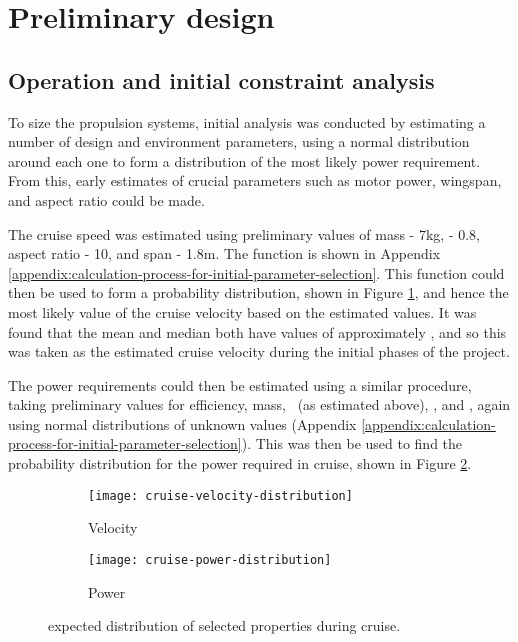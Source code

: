 \documentclass[../../main.tex]{subfiles}
\begin{document}

\section{Preliminary design} \label{sec:design-process:preliminary-design}

\subsection{Operation and initial constraint analysis} \label{sec:design-process:preliminary-design:operation-and-initial-constraint-analysis}

To size the propulsion systems, initial analysis was conducted by estimating a number of design and environment parameters, using a normal distribution around each one to form a distribution of the most likely power requirement.
From this, early estimates of crucial parameters such as motor power, wingspan, and aspect ratio could be made.

The cruise speed was estimated using preliminary values of mass - 7kg, \cl - 0.8, aspect ratio - 10, and span - 1.8m.
The function is shown in Appendix \ref{appendix:calculation-process-for-initial-parameter-selection}.
This function could then be used to form a probability distribution, shown in Figure \ref{fig:cruise-distribution:velocity}, and hence the most likely value of the cruise velocity based on the estimated values.
It was found that the mean and median both have values of approximately , and so this was taken as the estimated cruise velocity during the initial phases of the project. 

The power requirements could then be estimated using a similar procedure, taking preliminary values for efficiency, mass, \vcruise \, (as estimated above), \cl, and \cd, again using normal distributions of unknown values (Appendix \ref{appendix:calculation-process-for-initial-parameter-selection}).
This was then be used to find the probability distribution for the power required in cruise, shown in Figure \ref{fig:cruise-distribution:power}.

\begin{figure}[H]
    \centering
    \begin{subfigure}[b]{0.49\columnwidth}
        \centering
        \texttt{[image: cruise-velocity-distribution]}
        \caption{Velocity}
        \label{fig:cruise-distribution:velocity}
    \end{subfigure}
    \hfill
    \begin{subfigure}[b]{0.49\columnwidth}
        \centering
        \texttt{[image: cruise-power-distribution]}
        \caption{Power}
        \label{fig:cruise-distribution:power}
    \end{subfigure}

    \caption{expected distribution of selected properties during cruise.}
    \label{fig:cruise-distribution}
\end{figure}
\end{document}
